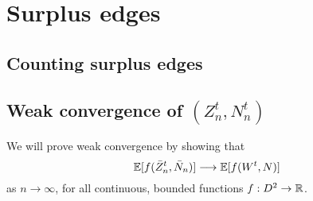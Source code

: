 
\chapter{Surplus edges}

\section{Counting surplus edges}

\begin{figure}
	
\end{figure}

\section{Weak convergence of $(Z^t_n, N^t_n)$}


We will prove weak convergence by showing that
\begin{equation}
\mathbb{E}[ f(\bar{Z}^t_n, \bar{N}_n) ] \longrightarrow \mathbb{E}[ f(W^t, N) ]
\end{equation}
as $n \rightarrow \infty$, 
for all continuous, bounded functions 
$f: D^2 \rightarrow \mathbb{R}$.
